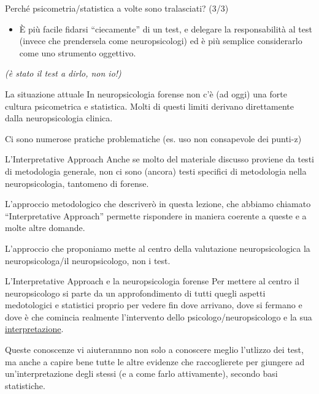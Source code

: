 \documentclass[
  ignorenonframetext,
]{beamer}
\providecommand{\tightlist}{%
  \setlength{\itemsep}{0pt}\setlength{\parskip}{0pt}}
\begin{document}
\begin{frame}{Perché psicometria/statistica a volte sono tralasciati?
(3/3)}
\label{perchuxe9-psicometriastatistica-a-volte-sono-tralasciati-33}
\begin{itemize}
\tightlist
\item
  È più facile fidarsi ``ciecamente'' di un test, e delegare la
  responsabilità al test (invece che prendersela come neuropsicologi) ed
  è più semplice considerarlo come uno strumento oggettivo.
\end{itemize}

\emph{(è stato il test a dirlo, non io!)}
\end{frame}

\begin{frame}{La situazione attuale}
\label{la-situazione-attuale}
In neuropsicologia forense non c'è (ad oggi) una forte cultura
psicometrica e statistica. Molti di questi limiti derivano direttamente
dalla neuropsicologia clinica.

Ci sono numerose pratiche problematiche (es. uso non consapevole dei
punti-z)
\end{frame}

\begin{frame}{L'Interpretative Approach}
\label{linterpretative-approach}
Anche se molto del materiale discusso proviene da testi di metodologia
generale, non ci sono (ancora) testi specifici di metodologia nella
neuropsicologia, tantomeno di forense.

L'approccio metodologico che descriverò in questa lezione, che abbiamo
chiamato ``Interpretative Approach'' permette rispondere in maniera
coerente a queste e a molte altre domande.

L'approccio che proponiamo mette al centro della valutazione
neuropsicologica la neuropsicologa/il neuropsicologo, non i test.
\end{frame}

\begin{frame}{L'Interpretative Approach e la neuropsicologia forense}
\label{linterpretative-approach-e-la-neuropsicologia-forense}
Per mettere al centro il neuropsicologo si parte da un approfondimento
di tutti quegli aspetti medotologici e statistici proprio per vedere fin
dove arrivano, dove si fermano e dove è che comincia realmente
l'intervento dello psicologo/neuropsicologo e la sua
\underline{interpretazione}.

Queste conoscenze vi aiuterannno non solo a conoscere meglio l'utlizzo
dei test, ma anche a capire bene tutte le altre evidenze che
raccoglierete per giungere ad un'interpretazione degli stessi (e a come
farlo attivamente), secondo basi statistiche.
\end{frame}
\end{document}
